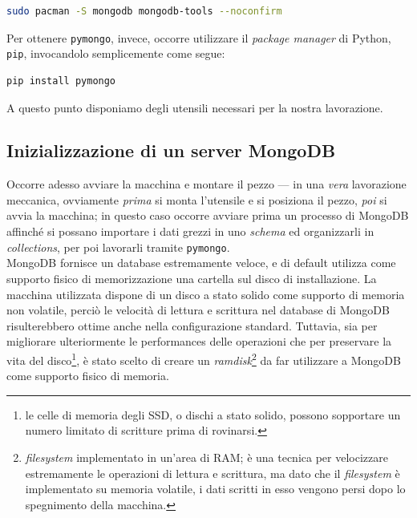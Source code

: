 		\begin{lstlisting}[language=bash,caption={installazione di MongoDB}]
			sudo pacman -S mongodb mongodb-tools --noconfirm
		\end{lstlisting}

		Per ottenere \texttt{pymongo}, invece, occorre utilizzare il \textit{package manager} di Python, \texttt{pip}, invocandolo semplicemente come segue:

		\begin{lstlisting}[language=bash,caption={installazione di pymongo}]
			pip install pymongo
		\end{lstlisting}

		A questo punto disponiamo degli utensili necessari per la nostra lavorazione.

	\subsection{Inizializzazione di un server MongoDB}

	Occorre adesso avviare la macchina e montare il pezzo --- in una \textit{vera} lavorazione meccanica, ovviamente \textit{prima} si monta l'utensile e si posiziona il pezzo, \textit{poi} si avvia la macchina; in questo caso occorre avviare prima un processo di MongoDB affinché si possano importare i dati grezzi in uno \textit{schema} ed organizzarli in \textit{collections}, per poi lavorarli tramite \texttt{pymongo}. \\

	MongoDB fornisce un database estremamente veloce, e di default utilizza come supporto fisico di memorizzazione una cartella sul disco di installazione. La macchina utilizzata dispone di un disco a stato solido come supporto di memoria non volatile, perciò le velocità di lettura e scrittura nel database di MongoDB risulterebbero ottime anche nella configurazione standard. Tuttavia, sia per migliorare ulteriormente le performances delle operazioni che per preservare la vita del disco\footnote{le celle di memoria degli SSD, o dischi a stato solido, possono sopportare un numero limitato di scritture prima di rovinarsi.}, è stato scelto di creare un \textit{ramdisk}\footnote{\textit{filesystem} implementato in un'area di RAM; è una tecnica per velocizzare estremamente le operazioni di lettura e scrittura, ma dato che il \textit{filesystem} è implementato su memoria volatile, i dati scritti in esso vengono persi dopo lo spegnimento della macchina.} da far utilizzare a MongoDB come supporto fisico di memoria. \\

